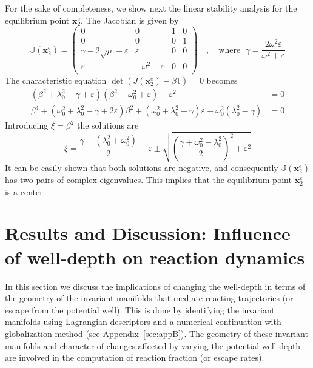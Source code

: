\documentclass{ws-ijbc}
\begin{document}
For the sake of completeness, we show next the linear stability analysis for the equilibrium point $\mathbf{x}_2^e$. The Jacobian is given by
\begin{equation}
\mathbb{J}(\mathbf{x}_2^e) = 
\begin{pmatrix}
0 & 0 & 1 & 0 \\
0 & 0 & 0 & 1 \\
\gamma -2\sqrt{\mu} - \varepsilon & \varepsilon & 0 & 0 \\
\varepsilon & -\omega^2 - \varepsilon & 0 & 0 \\
\end{pmatrix} \quad,\quad \text{where }\; \gamma = \dfrac{2\omega^2\varepsilon}{\omega^2 + \varepsilon} \label{jacobian_center}
\end{equation}
The characteristic equation $\det\left(J(\mathbf{x}_2^e) - \beta \, \mathbb{I}\right) = 0$ becomes
\begin{equation}
\begin{aligned}
\left(\beta^2 + \lambda_0^2 - \gamma + \varepsilon \right) \left(\beta^2 + \omega_0^2 + \varepsilon\right) - \varepsilon^2 & = 0 \\ 
\beta^4 + \left(\omega_0^2 + \lambda_0^2 - \gamma + 2\varepsilon\right)\beta^2 + \left(\omega_0^2 + \lambda_0^2 - \gamma\right)\varepsilon + \omega_0^2\left(\lambda_0^2 - \gamma\right) & = 0
\label{char_eq_center}
\end{aligned}
\end{equation}
Introducing $\xi = \beta^2$ the solutions are
\begin{equation}
\xi = \dfrac{\gamma - \left(\lambda_0^2 + \omega_0^2\right)}{2} - \varepsilon \pm \sqrt{\left(\dfrac{\gamma + \omega_0^2 - \lambda_0^2}{2}\right)^2 + \varepsilon^2}
\end{equation}
It can be easily shown that both solutions are negative, and consequently $\mathbb{J}(\mathbf{x}_2^e)$ has two pairs of complex eigenvalues. This implies that the equilibrium point $\mathbf{x}_2^e$ is a center.


\section{Results and Discussion: Influence of well-depth on reaction dynamics}
\label{sec:RD}

In this section we discuss the implications of changing the well-depth in terms of the geometry of the invariant manifolds that mediate reacting trajectories (or escape from the potential well). This is done by identifying the invariant manifolds using Lagrangian descriptors and a numerical continuation with globalization method (see Appendix~\ref{sec:appB}). The geometry of these invariant manifolds and character of changes affected by varying the potential well-depth are involved in the computation of reaction fraction (or escape rates). 
\end{document}
